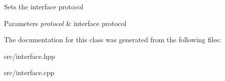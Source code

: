 Sets the interface protocol


\begin{DoxyParams}{Parameters}
{\em protocol} & interface protocol \\
\hline
\end{DoxyParams}


The documentation for this class was generated from the following files\+:\begin{DoxyCompactItemize}
\item 
src/interface.\+hpp\item 
src/interface.\+cpp\end{DoxyCompactItemize}
